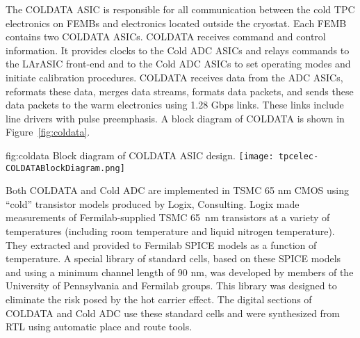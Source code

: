 The COLDATA ASIC is responsible for all communication between the cold TPC electronics on FEMBs and electronics located outside the cryostat.  Each FEMB contains two COLDATA ASICs. COLDATA receives command and control information.  It provides clocks to the Cold ADC ASICs and relays commands to the LArASIC front-end and to the Cold ADC ASICs to set operating modes and initiate calibration procedures.  COLDATA receives data from the ADC ASICs, reformats these data, merges data streams, formats data packets, and sends these data packets to the warm electronics using 1.28 Gbps links.  These links include line drivers with pulse preemphasis.  A block diagram of COLDATA is shown in Figure~\ref{fig:coldata}.  

\begin{dunefigure}
{fig:coldata}
{Block diagram of COLDATA ASIC design.}
\texttt{[image: tpcelec-COLDATABlockDiagram.png]}
\end{dunefigure}

Both COLDATA and Cold ADC are implemented in TSMC 65 nm CMOS using ``cold'' transistor models produced by Logix, Consulting.  Logix made measurements of Fermilab-supplied TSMC 65~nm transistors at a variety of temperatures (including room temperature and liquid nitrogen temperature).  They extracted and provided to Fermilab SPICE models as a function of temperature.  A special library of standard cells, based on these SPICE models and using a minimum channel length of 90 nm, was developed by members of the University of Pennsylvania and Fermilab groups.  This library was designed to eliminate the risk posed by the hot carrier effect.  The digital sections of COLDATA and Cold ADC use these standard cells and were synthesized from RTL using automatic place and route tools.
